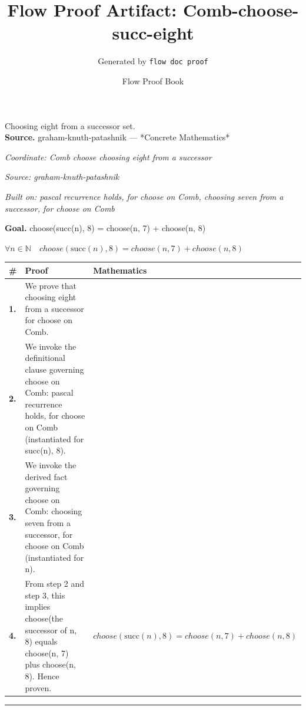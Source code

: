 \documentclass[11pt]{article}
\title{Flow Proof Artifact: Comb-choose-succ-eight}
\author{Generated by \texttt{flow doc proof}}
\date{Flow Proof Book}
\theoremstyle{definition}
\begin{document}
\maketitle
Choosing eight from a successor set.\\[0.5em]
\textbf{Source.} graham-knuth-patashnik — *Concrete Mathematics*\\[0.5em]
\bigskip
{}\par
\smallskip\noindent\textit{Coordinate: Comb \cdot choose \cdot choosing eight from a successor}\par
\smallskip\noindent\textit{Source: graham-knuth-patashnik}\par
\smallskip\noindent\textit{Built on: pascal recurrence holds, for choose on Comb, choosing seven from a successor, for choose on Comb}\par
\medskip
\noindent\textbf{Goal.} choose(succ(n), 8) = choose(n, 7) + choose(n, 8)\par
\noindent$\displaystyle \forall n \in \mathbb{N}\quad choose(\mathrm{succ}(n), 8) = choose(n, 7) + choose(n, 8)$\par
\medskip
\noindent
\begin{tabular}{@{} >{\raggedright\arraybackslash}p{} >{\raggedright\arraybackslash}p{} >{\raggedleft\arraybackslash}p{} @{}}
\textbf{\#} & \textbf{Proof} & \textbf{Mathematics} \\
\midrule
\textbf{1.} & We prove that choosing eight from a successor for choose on Comb. & \\[0.45em]
\textbf{2.} & We invoke the definitional clause governing choose on Comb: pascal recurrence holds, for choose on Comb (instantiated for succ(n), 8). & \\[0.45em]
\textbf{3.} & We invoke the derived fact governing choose on Comb: choosing seven from a successor, for choose on Comb (instantiated for n). & \\[0.45em]
\textbf{4.} & From step 2 and step 3, this implies choose(the successor of n, 8) equals choose(n, 7) plus choose(n, 8). Hence proven. & $\displaystyle choose(\mathrm{succ}(n), 8) = choose(n, 7) + choose(n, 8)$ \\[0.45em]
\bottomrule
\end{tabular}
\label{thm:Comb-choose-choosing_eight_from_a_successor}
\par\medskip\hrule
\end{document}

